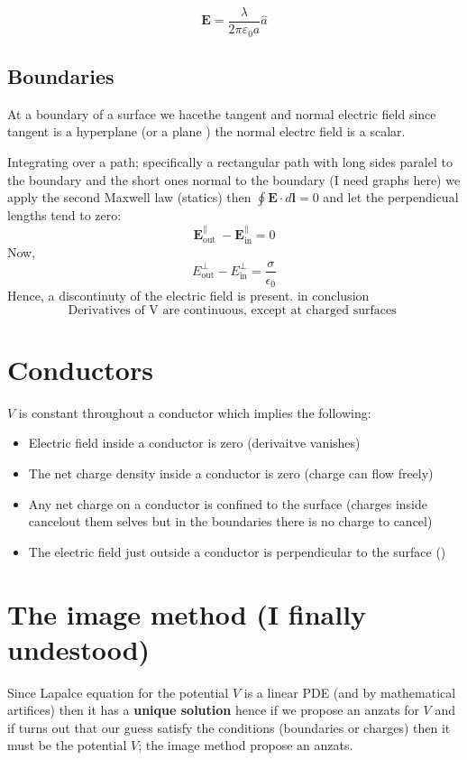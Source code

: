 $$\boxed{\mathbf{E}=\frac{\lambda}{2\pi \varepsilon_0 a}\hat{
   a 
}}
$$

\subsection{Boundaries}
At a boundary of a surface we hacethe tangent and normal electric field since tangent is a hyperplane (or a plane ) the normal electrc field is a scalar.

Integrating over a path; specifically a rectangular path with long sides paralel to the boundary and the short ones normal to the boundary (I need graphs here) we apply the second Maxwell law (statics) then $\oint \mathbf{E} \cdot d\mathbf{l}=0$ and let the perpendicual lengths tend to zero:
$$\boxed{\mathbf{E}_{\text {out }}^{\|}-\mathbf{E}_{\mathrm{in}}^{\|}=0}$$
Now, 
$$E_{\mathrm{out}}^{\perp}-E_{\mathrm{in}}^{\perp}=\frac{\sigma}{\epsilon_{0}}$$
Hence, a discontinuty of the electric field is present. in conclusion $$\boxed{
   \text{
      Derivatives of V are continuous, except at charged surfaces  
   } 
}$$
\section{Conductors}
$V$ is constant throughout a conductor which implies the following:
\begin{itemize}
    \item Electric field inside a conductor is zero (derivaitve vanishes)
    \item The net charge density inside a conductor is zero (charge can flow freely)
    \item Any net charge on a conductor is confined to the surface (charges inside cancelout them selves but in the boundaries there is no charge to cancel)
    \item The electric field just  outside a conductor is perpendicular to the surface ()
\end{itemize}
\section{The image method (I finally undestood)}
Since Lapalce equation for the potential $V$ is a linear PDE (and by mathematical artifices) then it has a {
   \bf unique solution 
}  hence if we propose an anzats for $V$ and if turns out that our guess satisfy the conditions (boundaries or charges) then it must be the potential $V$; the image method propose an anzats.


